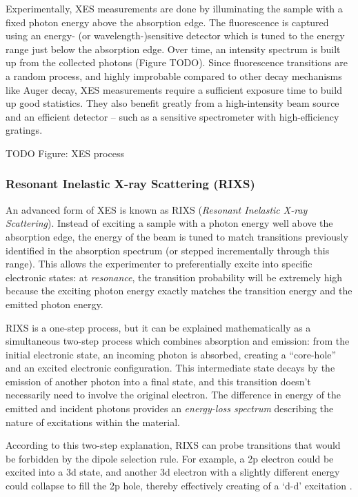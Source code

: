 Experimentally, XES measurements are done by illuminating the sample with a fixed photon energy above the absorption edge.  The fluorescence is captured using an energy- (or wavelength-)sensitive detector which is tuned to the energy range just below the absorption edge.  Over time, an intensity spectrum is built up from the collected photons (Figure TODO).  Since fluorescence transitions are a random process, and highly improbable compared to other decay mechanisms like Auger decay, XES measurements require a sufficient exposure time to build up good statistics.  They also benefit greatly from a high-intensity beam source and an efficient detector -- such as a sensitive spectrometer with high-efficiency gratings.

TODO Figure: XES process

\subsubsection{Resonant Inelastic X-ray Scattering (RIXS)}
An advanced form of XES is known as RIXS (\emph{Resonant Inelastic X-ray Scattering}).  Instead of exciting a sample with a photon energy well above the absorption edge, the energy of the beam is tuned to match transitions previously identified in the absorption spectrum (or stepped incrementally through this range).  This allows the experimenter to preferentially excite into specific electronic states: at \emph{resonance}, the transition probability will be extremely high because the exciting photon energy exactly matches the transition energy and the emitted photon energy.

RIXS is a one-step process, but it can be explained mathematically as a simultaneous two-step process which combines absorption and emission: from the initial electronic state, an incoming photon is absorbed, creating a ``core-hole'' and an excited electronic configuration.  This intermediate state decays by the emission of another photon into a final state, and this transition doesn't necessarily need to involve the original electron.  The difference in energy of the emitted and incident photons provides an \emph{energy-loss spectrum} describing the nature of excitations within the material.

According to this two-step explanation, RIXS can probe transitions that would be forbidden by the dipole selection rule. For example, a 2p electron could be excited into a 3d state, and another 3d electron with a slightly different energy could collapse to fill the 2p hole, thereby effectively creating of a `d-d' excitation \cite{But96}.
